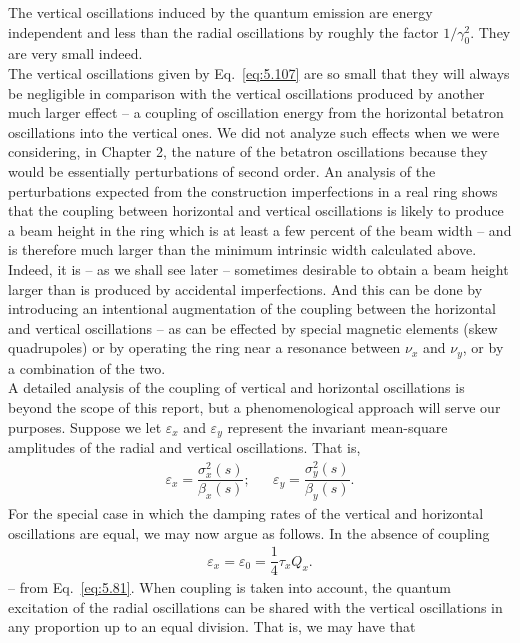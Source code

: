 The vertical oscillations induced by the quantum emission are energy independent and less than the radial oscillations by roughly the factor $1/\gamma_0^2$. They are very small indeed.\\
The vertical oscillations given by Eq.~\eqref{eq:5.107} are so small that they will always be negligible in comparison with the vertical oscillations produced by another much larger effect -- a coupling of oscillation energy from the horizontal betatron oscillations into the vertical
 ones. We did not analyze such effects when we were considering, in Chapter 2, the nature of the betatron oscillations because they would be essentially perturbations of second order. An analysis of the perturbations expected from the construction imperfections in a real ring shows that the coupling between horizontal and vertical oscillations is likely to produce a beam height in the ring which is at least a few percent of the beam width -- and is therefore much larger than the minimum intrinsic width calculated above.\\
Indeed, it is -- as we shall see later -- sometimes desirable to obtain a beam height larger than is produced by accidental imperfections. And this can be done by introducing an intentional
 augmentation of the coupling between the horizontal and vertical oscillations -- as can be effected by special magnetic elements (skew quadrupoles) or by operating the ring near a resonance between $\nu_x$ and $\nu_y$, or by a combination of the two.\\
A detailed analysis of the coupling of vertical and horizontal oscillations is beyond the scope of this report, but a phenomenological approach will serve our purposes. Suppose we let $\varepsilon_x$ and $\varepsilon_y$ represent the invariant mean-square amplitudes of the radial and vertical oscillations. That is,
\begin{align} \label{eq:5.109}
	\varepsilon_x = \dfrac{\sigma_x^2(s)}{\beta_x(s)}; && \varepsilon_y = \dfrac{\sigma_y^2(s)}{\beta_y(s)}.
\end{align}
For the special case in which the damping rates of the vertical and horizontal oscillations are equal, we may now argue as follows. In the absence of coupling
\begin{align}
	\varepsilon_x = \varepsilon_0 = \dfrac{1}{4} \tau_x Q_x.
\end{align}
-- from Eq.~\eqref{eq:5.81}. When coupling is taken into account, the quantum excitation of the radial oscillations can be shared with the vertical oscillations in any proportion up to an equal division. That is, we may have that
